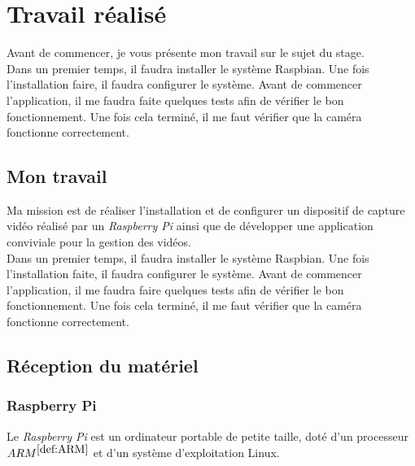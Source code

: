 \chapter{Travail réalisé}
Avant de commencer, je vous présente mon travail sur le sujet du stage.\\[0.2cm]
Dans un premier temps, il faudra installer le système Raspbian. Une fois l’installation faire, il faudra configurer le système. Avant de commencer l’application, il me faudra faite quelques tests afin de vérifier le bon fonctionnement. Une fois cela terminé, il me faut vérifier que la caméra fonctionne correctement.

    \section{Mon travail}
    \begin{flushleft}
        Ma mission est de réaliser l'installation et de configurer un dispositif de capture vidéo réalisé par un \textit{Raspberry Pi} ainsi que de développer une application conviviale pour la gestion des vidéos.\\[0.2cm]
    
        Dans un premier temps, il faudra installer le système Raspbian.
        Une fois l'installation faite, il faudra configurer le système.
        Avant de commencer l'application, il me faudra faire quelques tests afin de vérifier le bon fonctionnement.
        Une fois cela terminé, il me faut vérifier que la caméra fonctionne correctement.    
    \end{flushleft}

    \section{Réception du matériel}
        \subsection{Raspberry Pi}
        Le \textit{Raspberry Pi} est un ordinateur portable de petite taille, doté d'un processeur \underline{$ ARM^{\ref{def:ARM}}$}  et d'un système d'exploitation Linux.



